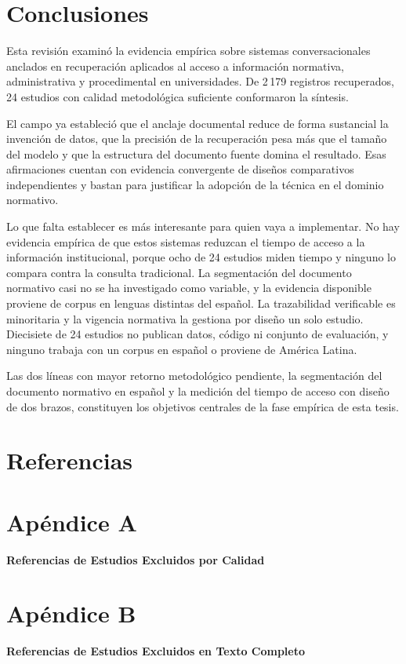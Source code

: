 \documentclass[man,12pt,floatsintext,donotrepeattitle]{apa7}
\begin{document}
\section{Conclusiones}
Esta revisión examinó la evidencia empírica sobre sistemas conversacionales anclados en recuperación aplicados al acceso a información normativa, administrativa y procedimental en universidades. De 2\,179 registros recuperados, 24 estudios con calidad metodológica suficiente conformaron la síntesis.

El campo ya estableció que el anclaje documental reduce de forma sustancial la invención de datos, que la precisión de la recuperación pesa más que el tamaño del modelo y que la estructura del documento fuente domina el resultado. Esas afirmaciones cuentan con evidencia convergente de diseños comparativos independientes y bastan para justificar la adopción de la técnica en el dominio normativo.

Lo que falta establecer es más interesante para quien vaya a implementar. No hay evidencia empírica de que estos sistemas reduzcan el tiempo de acceso a la información institucional, porque ocho de 24 estudios miden tiempo y ninguno lo compara contra la consulta tradicional. La segmentación del documento normativo casi no se ha investigado como variable, y la evidencia disponible proviene de corpus en lenguas distintas del español. La trazabilidad verificable es minoritaria y la vigencia normativa la gestiona por diseño un solo estudio. Diecisiete de 24 estudios no publican datos, código ni conjunto de evaluación, y ninguno trabaja con un corpus en español o proviene de América Latina.

Las dos líneas con mayor retorno metodológico pendiente, la segmentación del documento normativo en español y la medición del tiempo de acceso con diseño de dos brazos, constituyen los objetivos centrales de la fase empírica de esta tesis.

\section*{Referencias}
\printbibliography[heading=none,notkeyword=excluidocalidad,notkeyword=excluidotexto]

\section*{Apéndice A}
{\centering\textbf{Referencias de Estudios Excluidos por Calidad}\par}
\printbibliography[heading=none,keyword=excluidocalidad]

\section*{Apéndice B}
{\centering\textbf{Referencias de Estudios Excluidos en Texto Completo}\par}
\printbibliography[heading=none,keyword=excluidotexto]
\end{document}
